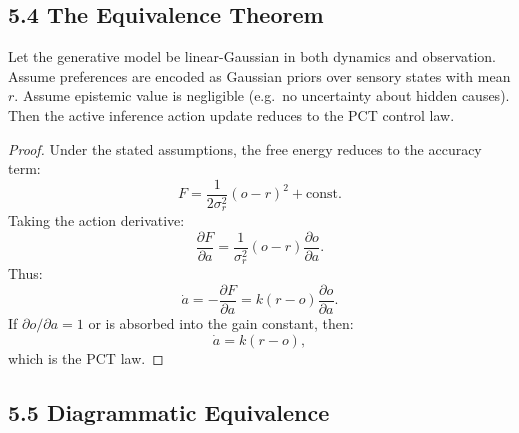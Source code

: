 \documentclass[11pt,a4paper,twoside]{article}
\begin{document}
\subsection*{5.4 The Equivalence Theorem}

\begin{theorem}
Let the generative model be linear-Gaussian in both dynamics and observation.
Assume preferences are encoded as Gaussian priors over sensory states with mean $r$.
Assume epistemic value is negligible (e.g.\ no uncertainty about hidden causes).
Then the active inference action update reduces to the PCT control law.
\end{theorem}

\begin{proof}
Under the stated assumptions, the free energy reduces to the accuracy term:
\[
F = \frac{1}{2\sigma_r^2}(o-r)^2 + \text{const}.
\]
Taking the action derivative:
\[
\frac{\partial F}{\partial a}
= \frac{1}{\sigma_r^2}(o-r)\frac{\partial o}{\partial a}.
\]
Thus:
\[
\dot{a} = -\frac{\partial F}{\partial a}
= k(r - o)\frac{\partial o}{\partial a}.
\]
If $\partial o/\partial a = 1$ or is absorbed into the gain constant, then:
\[
\dot{a} = k(r - o),
\]
which is the PCT law.
\end{proof}

\subsection*{5.5 Diagrammatic Equivalence}

\vspace{1em}
\begin{center}

\end{center}
\vspace{1em}
\end{document}
